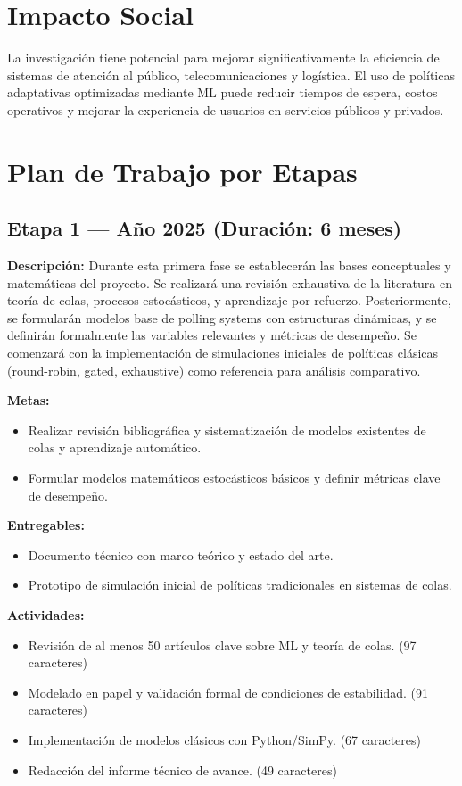 \documentclass[12pt]{article}
\begin{document}
\section*{Impacto Social}
La investigación tiene potencial para mejorar significativamente la eficiencia de sistemas de atención al público, telecomunicaciones y logística. El uso de políticas adaptativas optimizadas mediante ML puede reducir tiempos de espera, costos operativos y mejorar la experiencia de usuarios en servicios públicos y privados.
\section*{Plan de Trabajo por Etapas}

\subsection*{Etapa 1 — Año 2025 (Duración: 6 meses)}
\textbf{Descripción:} Durante esta primera fase se establecerán las bases conceptuales y matemáticas del proyecto. Se realizará una revisión exhaustiva de la literatura en teoría de colas, procesos estocásticos, y aprendizaje por refuerzo. Posteriormente, se formularán modelos base de polling systems con estructuras dinámicas, y se definirán formalmente las variables relevantes y métricas de desempeño. Se comenzará con la implementación de simulaciones iniciales de políticas clásicas (round-robin, gated, exhaustive) como referencia para análisis comparativo.

\textbf{Metas:}
\begin{itemize}
  \item Realizar revisión bibliográfica y sistematización de modelos existentes de colas y aprendizaje automático.
  \item Formular modelos matemáticos estocásticos básicos y definir métricas clave de desempeño.
\end{itemize}

\textbf{Entregables:}
\begin{itemize}
  \item Documento técnico con marco teórico y estado del arte.
  \item Prototipo de simulación inicial de políticas tradicionales en sistemas de colas.
\end{itemize}

\textbf{Actividades:}
\begin{itemize}
  \item Revisión de al menos 50 artículos clave sobre ML y teoría de colas. (97 caracteres)
  \item Modelado en papel y validación formal de condiciones de estabilidad. (91 caracteres)
  \item Implementación de modelos clásicos con Python/SimPy. (67 caracteres)
  \item Redacción del informe técnico de avance. (49 caracteres)
\end{itemize}
\end{document}
